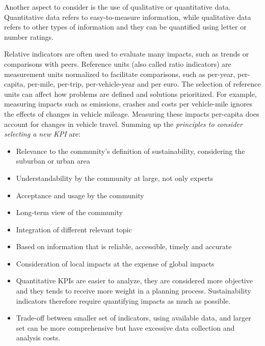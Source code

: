 Another aspect to consider is the use of qualitative or quantitative data. Quantitative data refers to easy-to-measure information, while qualitative data refers to other types of information and they can be quantified using letter or number ratings. 

Relative indicators are often used to evaluate many impacts, such as trends or comparisons with peers. Reference units (also called ratio indicators) are measurement units normalized to facilitate comparisons, such as per-year, per-capita, per-mile, per-trip, per-vehicle-year and per euro. The selection of reference units can affect how problems are defined and solutions prioritized. For example, measuring impacts such as emissions, crashes and costs per vehicle-mile ignores the effects of changes in vehicle mileage. Measuring these impacts per-capita does account for changes in vehicle travel.
\newpage
Summing up the \emph{principles to consider selecting a new KPI} are:
\begin{itemize}
    \item Relevance to the community's definition of sustainability, considering the suburban or urban area
    \item Understandability by the community at large, not only experts
    \item Acceptance and usage by the community
    \item Long-term view of the community
    \item Integration of different relevant topic
    \item Based on information that is reliable, accessible, timely and accurate
    \item Consideration of local impacts at the expense of global impacts
    \item Quantitative KPIs are easier to analyze, they are considered more objective and they tends to receive more weight in a planning process. Sustainability indicators therefore require quantifying impacts as much as possible.
    \item Trade-off between smaller set of indicators, using available data, and larger set can be more comprehensive but have excessive data collection and analysis costs. 
\end{itemize}







